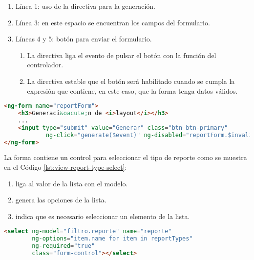\begin{enumerate}
	\item Línea 1: uso de la directiva  para la generación.
	\item Línea 3: en este espacio se encuentran los campos del formulario.
	\item Líneas 4 y 5: botón para enviar el formulario.
	\begin{enumerate}
		\item La directiva  liga el evento de pulsar el botón con la función del controlador.
		\item La directiva  estable que el botón será habilitado cuando se cumpla la expresión que contiene, en este caso, que la forma tenga datos válidos.
	\end{enumerate}
\end{enumerate}

\begin{lstlisting}[language=HTML, captionpos=b, caption={Forma de generación de reportes}, label={lst:view-report-form}]
<ng-form name="reportForm">
	<h3>Generaci&oacute;n de <i>layout</i></h3>
	...
	<input type="submit" value="Generar" class="btn btn-primary"
			ng-click="generate($event)" ng-disabled="reportForm.$invalid"/>	
</ng-form>
\end{lstlisting}

La forma contiene un control para seleccionar el tipo de reporte como se muestra en el Código \ref{lst:view-report-type-select}:
\begin{enumerate}
	\item {} liga al valor de la lista con el modelo.
	\item {} genera las opciones de la lista.
	\item {} indica que es necesario seleccionar un elemento de la lista.
\end{enumerate}
\begin{lstlisting}[language=HTML, captionpos=b, caption={Lista para seleccionar el tipo de reporte.}, label={lst:view-report-type-select}]
<select ng-model="filtro.reporte" name="reporte"
		ng-options="item.name for item in reportTypes"
		ng-required="true"
		class="form-control"></select>
\end{lstlisting}

